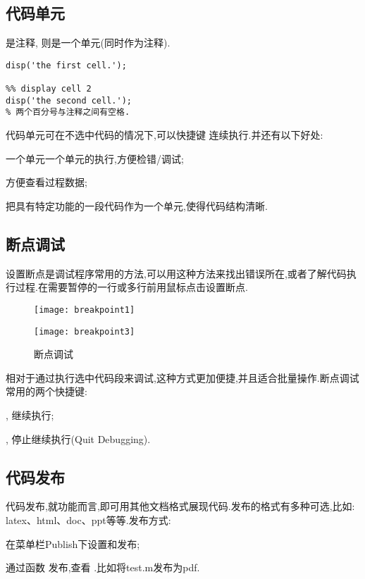 


\subsection{代码单元}
\mcode{\%} 是注释, \mcode{\%\%} 则是一个单元(同时作为注释). 

\vspace{-0.8cm}
\begin{lstlisting}[caption=代码单元]
%% display cell 1
disp('the first cell.');

%% display cell 2
disp('the second cell.');
% 两个百分号与注释之间有空格.
\end{lstlisting}

代码单元可在不选中代码的情况下,可以快捷键  连续执行.并还有以下好处:
\begindot
  \item 一个单元一个单元的执行,方便检错/调试;
  \item 方便查看过程数据;
  \item 把具有特定功能的一段代码作为一个单元,使得代码结构清晰.
\myenddot



\subsection{断点调试}
设置断点是调试程序常用的方法,可以用这种方法来找出错误所在,或者了解代码执行过程.在需要暂停的一行或多行前用鼠标点击设置断点.

\begin{figure}[htbp]
  \texttt{[image: breakpoint1]}
\end{figure}

\begin{figure}[htbp]
  \texttt{[image: breakpoint3]}
  \caption{断点调试}
\end{figure}

相对于通过执行选中代码段来调试,这种方式更加便捷,并且适合批量操作.断点调试常用的两个快捷键:
\begindot
  \item {}, 继续执行;
  \item {}, 停止继续执行(Quit Debugging).
\myenddot



\subsection{代码发布}
 代码发布,就功能而言,即可用其他文档格式展现代码.发布的格式有多种可选,比如: latex、html、doc、ppt等等.发布方式:
\begindot
  \item 在菜单栏Publish下设置和发布;
  \item 通过函数  发布,查看 .比如将test.m发布为pdf.
\myenddot


